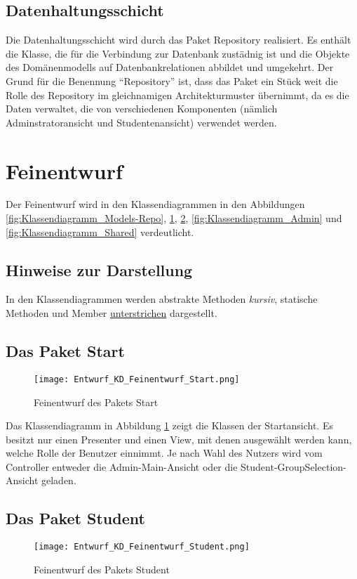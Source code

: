 \subsection{Datenhaltungsschicht}
Die Datenhaltungsschicht wird durch das Paket Repository realisiert. Es enthält die Klasse, die für die Verbindung zur Datenbank zustädnig ist und die Objekte des Domänenmodells auf Datenbankrelationen abbildet und umgekehrt. Der Grund für die Benennung "`Repository"' ist, dass das Paket ein Stück weit die Rolle des Repository im gleichnamigen Architekturmuster übernimmt, da es die Daten verwaltet, die von verschiedenen Komponenten (nämlich Adminstratoransicht und Studentenansicht) verwendet werden.

\section{Feinentwurf}
Der Feinentwurf wird in den Klassendiagrammen in den Abbildungen \ref{fig:Klassendiagramm_Models-Repo}, \ref{fig:Klassendiagramm_Start}, \ref{fig:Klassendiagramm_Student}, \ref{fig:Klassendiagramm_Admin} und \ref{fig:Klassendiagramm_Shared} verdeutlicht.

\subsection{Hinweise zur Darstellung}
In den Klassendiagrammen werden abstrakte Methoden \textit{kursiv}, statische Methoden und Member \underline{unterstrichen} dargestellt.

 \subsection{Das Paket Start}
 \begin{figure}
  \texttt{[image: Entwurf\_KD\_Feinentwurf\_Start.png]}
  \label{fig:Klassendiagramm_Start}
  \caption{Feinentwurf des Pakets Start}
 \end{figure}

 Das Klassendiagramm in Abbildung \ref{fig:Klassendiagramm_Start} zeigt die Klassen der Startansicht. Es besitzt nur einen Presenter und einen View, mit denen ausgewählt werden kann, welche Rolle der Benutzer einnimmt. Je nach Wahl des Nutzers wird vom Controller entweder die Admin-Main-Ansicht oder die Student-GroupSelection-Ansicht geladen.

 \subsection{Das Paket Student}
 \begin{figure}
    \texttt{[image: Entwurf\_KD\_Feinentwurf\_Student.png]}
    \label{fig:Klassendiagramm_Student}
    \caption{Feinentwurf des Pakets Student}
 \end{figure}

